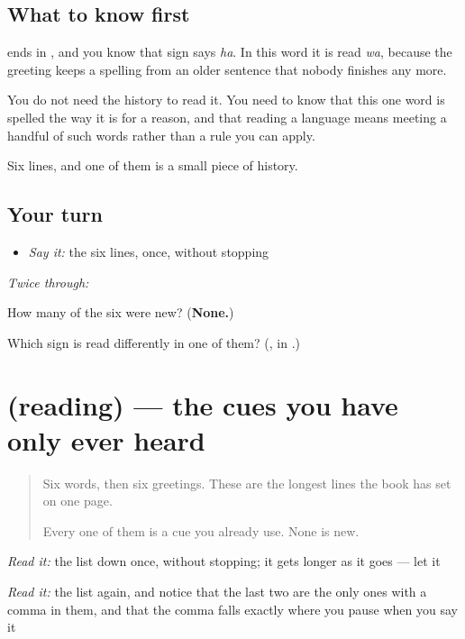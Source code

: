 \subsection*{What to know first}
\textbf{} ends in \textbf{}, and you know that sign says \emph{ha}. In this word it is read \emph{wa}, because the greeting keeps a spelling from an older sentence that nobody finishes any more.

You do not need the history to read it. You need to know that this one word is spelled the way it is for a reason, and that reading a language means meeting a handful of such words rather than a rule you can apply.

Six lines, and one of them is a small piece of history.

\subsection*{Your turn}
\begin{itemize}
\raggedright
  \item \emph{Say it:} the six lines, once, without stopping
\end{itemize}

\emph{Twice through:}

\begin{tcolorbox}[breakable,colback=teal!4,colframe=teal!35!black,title={Before you move on}]
How many of the six were new? (\textbf{None.})

Which sign is read differently in one of them? (\textbf{}, in .)
\end{tcolorbox}
\section[(reading)]{(reading) — the cues you have only ever heard}

\label{lesson:JA-C19-kyoushitsu}



\begin{quote}
Six words, then six greetings. These are the longest lines the book has set on one page.

Every one of them is a cue you already use. None is new.
\end{quote}

\begin{tcolorbox}[breakable,skin=enhanced,colback=orange!6,colframe=orange!45!black,boxrule=0.5pt,arc=1mm,left=6pt,right=6pt,top=4pt,bottom=4pt,fonttitle=\bfseries,title={Read this}]
\begin{quote}
     
\end{quote}

\emph{Read it:} the list down once, without stopping; it gets longer as it goes — let it

\emph{Read it:} the list again, and notice that the last two are the only ones with a comma in them, and that the comma falls exactly where you pause when you say it
\end{tcolorbox}

